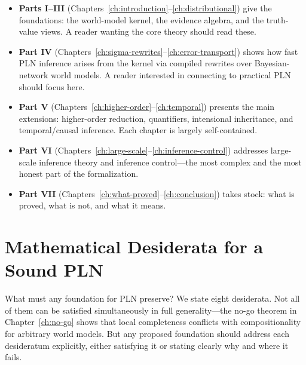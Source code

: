 \documentclass[11pt,openany]{report}
\begin{document}
\begin{itemize}
\item \textbf{Parts I--III} (Chapters~\ref{ch:introduction}--\ref{ch:distributional})
  give the foundations: the world-model kernel, the evidence algebra, and the
  truth-value views.  A reader wanting the core theory should read these.

\item \textbf{Part IV} (Chapters~\ref{ch:sigma-rewrites}--\ref{ch:error-transport})
  shows how fast PLN inference arises from the kernel via compiled rewrites
  over Bayesian-network world models.  A reader interested in connecting
  \xiPLN{} to practical PLN should focus here.

\item \textbf{Part V} (Chapters~\ref{ch:higher-order}--\ref{ch:temporal})
  presents the main extensions: higher-order reduction, quantifiers,
  intensional inheritance, and temporal/causal inference.  Each chapter is
  largely self-contained.

\item \textbf{Part VI} (Chapters~\ref{ch:large-scale}--\ref{ch:inference-control})
  addresses large-scale inference theory and inference control---the most
  complex and the most honest part of the formalization.

\item \textbf{Part VII} (Chapters~\ref{ch:what-proved}--\ref{ch:conclusion})
  takes stock: what is proved, what is not, and what it means.
\end{itemize}


\chapter{Mathematical Desiderata for a Sound PLN}
\label{ch:desiderata}

What must any foundation for PLN preserve?  We state eight desiderata.  Not
all of them can be satisfied simultaneously in full generality---the no-go
theorem in Chapter~\ref{ch:no-go} shows that local completeness conflicts
with compositionality for arbitrary world models.  But any proposed
foundation should address each desideratum explicitly, either satisfying it
or stating clearly why and where it fails.
\end{document}
